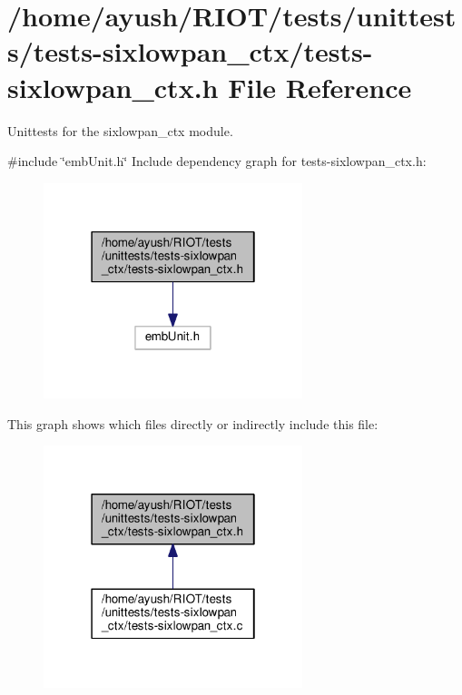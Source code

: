 \hypertarget{tests-sixlowpan__ctx_8h}{}\section{/home/ayush/\+R\+I\+O\+T/tests/unittests/tests-\/sixlowpan\+\_\+ctx/tests-\/sixlowpan\+\_\+ctx.h File Reference}
\label{tests-sixlowpan__ctx_8h}


Unittests for the {\ttfamily sixlowpan\+\_\+ctx} module.  


{\ttfamily \#include \char`\"{}emb\+Unit.\+h\char`\"{}}\newline
Include dependency graph for tests-\/sixlowpan\+\_\+ctx.h\+:
\nopagebreak
\begin{figure}[H]
\begin{center}
\leavevmode
\includegraphics[width=214pt]{tests-sixlowpan__ctx_8h__incl}
\end{center}
\end{figure}
This graph shows which files directly or indirectly include this file\+:
\nopagebreak
\begin{figure}[H]
\begin{center}
\leavevmode
\includegraphics[width=214pt]{tests-sixlowpan__ctx_8h__dep__incl}
\end{center}
\end{figure}
